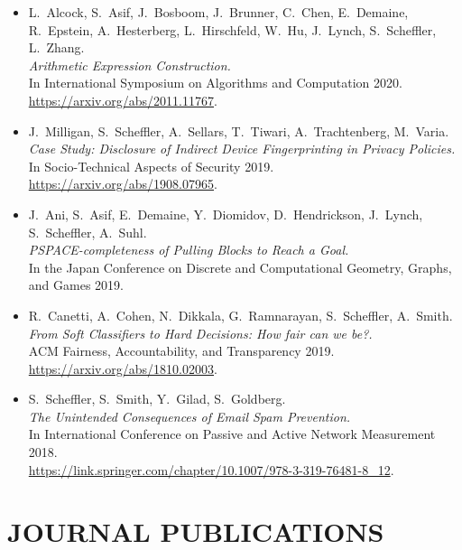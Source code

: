 \documentclass{res}
\begin{document}
\begin{resume}
\begin{itemize}
\item[\AEC] L.~Alcock, S.~Asif, J.~Bosboom, J.~Brunner, C.~Chen, E.~Demaine, R.~Epstein,
A.~Hesterberg, L.~Hirschfeld, W.~Hu, J.~Lynch, S.~Scheffler, L.~Zhang. \\
\emph{Arithmetic Expression Construction.} \\
In International Symposium on Algorithms and Computation 2020. \\
\url{https://arxiv.org/abs/2011.11767}.

\item[\devicefingerprinting] J.~Milligan, S.~Scheffler, A.~Sellars, T.~Tiwari, A.~Trachtenberg, M.~Varia.  \\
\emph{Case Study: Disclosure of Indirect Device Fingerprinting in Privacy Policies.} \\
In Socio-Technical Aspects of Security 2019. \\
\url{https://arxiv.org/abs/1908.07965}.

\item[\pullingblocks] J.~Ani, S.~Asif, E.~Demaine, Y.~Diomidov, D.~Hendrickson, J.~Lynch, S.~Scheffler, A.~Suhl. \\
\emph{PSPACE-completeness of Pulling Blocks to Reach a Goal.}  \\
In the Japan Conference on Discrete and Computational Geometry, Graphs, and Games 2019.

\item[\fairsibility] R.~Canetti, A.~Cohen, N.~Dikkala, G.~Ramnarayan, S.~Scheffler, A.~Smith. \\
\emph{From Soft Classifiers to Hard Decisions: How fair can we be?.} \\
ACM Fairness, Accountability, and Transparency 2019. \\
\url{https://arxiv.org/abs/1810.02003}.

\item[\emailspam] S.~Scheffler, S.~Smith, Y.~Gilad, S.~Goldberg. \\
\emph{The Unintended Consequences of Email Spam Prevention.} \\
In International Conference on Passive and Active Network Measurement 2018. \\
\url{https://link.springer.com/chapter/10.1007/978-3-319-76481-8\_12}.
\end{itemize}

\vspace{0.25in}

\section{JOURNAL PUBLICATIONS}
\vspace{0.25in}


\end{resume}
\end{document}
